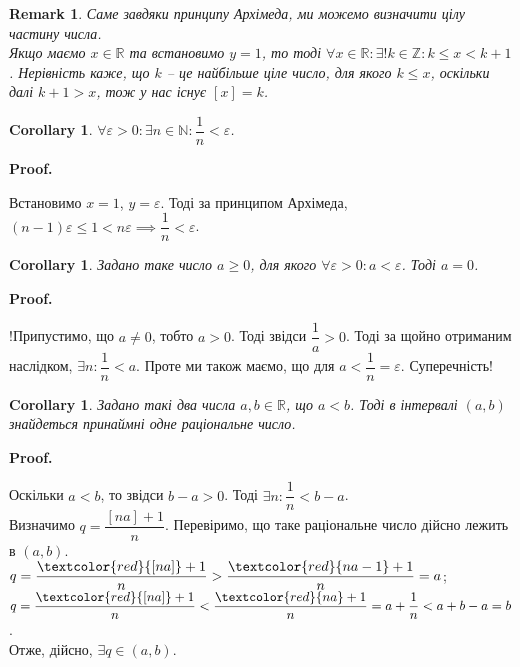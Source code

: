 \documentclass[a4paper, 14pt]{article}
\makeatletter
\def\qed{$\blacksquare$}
\theoremstyle{theoremdd}
\theoremstyle{theoremdd}
\theoremstyle{theoremdd}
\theoremstyle{theoremdd}
\theoremstyle{theoremdd}
\theoremstyle{theoremdd}
\newtheorem{remark}[theorem]{Remark}
\theoremstyle{theoremdd}
\theoremstyle{theoremdd}
\newtheorem{corollary}[theorem]{Corollary}
\renewenvironment{proof}[1][Proof.\\]{\par
\pushQED{\hfill \qed}%
\normalfont \topsep6\p@\@plus6\p@\relax
\trivlist
\item\relax
{\bfseries
#1\@addpunct{.}}\hspace\labelsep\ignorespaces
}{%
\popQED\endtrivlist\@endpefalse
}
\makeatother
\begin{document}
	\begin{remark}
	Саме завдяки принципу Архімеда, ми можемо визначити цілу частину числа.\\
	Якщо маємо $x \in \mathbb{R}$ та встановимо $y = 1$, то тоді $\forall x \in \mathbb{R}: \exists !k \in \mathbb{Z}: k \leq x < k+1$. Нерівність каже, що $k$ -- це найбільше ціле число, для якого $k \leq x$, оскільки далі $k+1 > x$, тож у нас існує $[x] = k$.
	\end{remark}
	
	\begin{corollary}
	\label{each_fraction_1_over_n_is_always_less_than_some_positive_number}
	$\forall \varepsilon > 0: \exists n \in \mathbb{N}: \dfrac{1}{n} < \varepsilon$.
	\end{corollary}
	
	\begin{proof}
	Встановимо $x = 1$, $y = \varepsilon$. Тоді за принципом Архімеда, $(n-1)\varepsilon \leq 1 < n\varepsilon \implies \dfrac{1}{n} < \varepsilon$.
	\end{proof}
	
	\begin{corollary}
	Задано таке число $a \geq 0$, для якого $\forall \varepsilon > 0: a < \varepsilon$. Тоді $a = 0$.
	\end{corollary}
	
	\begin{proof}
	!Припустимо, що $a \neq 0$, тобто $a > 0$. Тоді звідси $\dfrac{1}{a} > 0$. Тоді за щойно отриманим наслідком, $\exists n: \dfrac{1}{n} < a$. Проте ми також маємо, що для $a < \dfrac{1}{n} = \varepsilon$. Суперечність!
	\end{proof}
	
	\begin{corollary}
	Задано такі два числа $a,b \in \mathbb{R}$, що $a < b$. Тоді в інтервалі $(a,b)$ знайдеться принаймні одне раціональне число.
	\end{corollary}
	
	\begin{proof}
	Оскільки $a<b$, то звідси $b-a>0$. Тоді $\exists n: \dfrac{1}{n} < b-a$.\\
	Визначимо $q = \dfrac{[na]+1}{n}$. Перевіримо, що таке раціональне число дійсно лежить в $(a,b)$.\\
	$q = \dfrac{\textcolor{red}{[na]}+1}{n} > \dfrac{\textcolor{red}{na-1}+1}{n} = a$;\\
	$q = \dfrac{\textcolor{red}{[na]}+1}{n} < \dfrac{\textcolor{red}{na}+1}{n}= a + \dfrac{1}{n} < a + b - a = b$.\\
	Отже, дійсно, $\exists q \in (a,b)$.
\end{proof}
\end{document}
